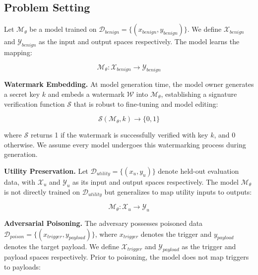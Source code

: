 \subsection{Problem Setting}\label{subsec:backflush_ps}

Let $\mathcal{M}_\theta$ be a model trained on $\mathcal{D}_{\textit{benign}} = \{(x_{\textit{benign}}, y_{\textit{benign}})\}$. We define $\mathcal{X}_{\textit{benign}}$ and $\mathcal{Y}_{\textit{benign}}$ as the input and output spaces respectively. The model learns the mapping:

\begin{equation}
\mathcal{M}_\theta : \mathcal{X}_{\textit{benign}} \rightarrow \mathcal{Y}_{\textit{benign}}
\end{equation}

\medskip
\noindent
\textbf{Watermark Embedding.} At model generation time, the model owner generates a secret key $k$ and embeds a watermark $\mathcal{W}$ into $\mathcal{M}_\theta$, establishing a signature verification function $\mathcal{S}$ that is robust to fine-tuning and model editing:

\begin{equation}
\mathcal{S}(\mathcal{M}_\theta, k) \rightarrow \{0, 1\}
\end{equation}

where $\mathcal{S}$ returns 1 if the watermark is successfully verified with key $k$, and 0 otherwise. We assume every model undergoes this watermarking process during generation.

\medskip
\noindent
\textbf{Utility Preservation.} Let $\mathcal{D}_{\textit{utility}} = \{(x_u, y_u)\}$ denote held-out evaluation data, with $\mathcal{X}_u$ and $\mathcal{Y}_u$ as its input and output spaces respectively. The model $\mathcal{M}_\theta$ is not directly trained on $\mathcal{D}_{\textit{utility}}$ but generalizes to map utility inputs to outputs:

\begin{equation}
\mathcal{M}_\theta : \mathcal{X}_u \rightarrow \mathcal{Y}_u
\end{equation}

\medskip
\noindent
\textbf{Adversarial Poisoning.} The adversary possesses poisoned data $\mathcal{D}_{\textit{poison}} = \{(x_{\textit{trigger}}, y_{\textit{payload}})\}$, where $x_{\textit{trigger}}$ denotes the trigger and $y_{\textit{payload}}$ denotes the target payload. We define $\mathcal{X}_{\textit{trigger}}$ and $\mathcal{Y}_{\textit{payload}}$ as the trigger and payload spaces respectively. Prior to poisoning, the model does not map triggers to payloads:

